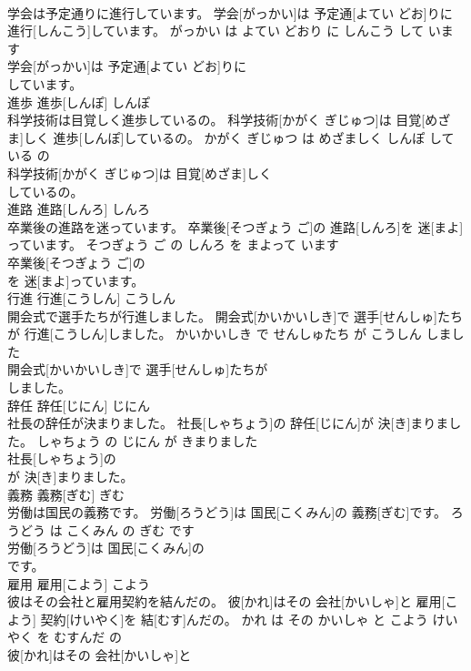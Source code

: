 \documentclass[8pt]{extreport}
\begin{document}
\begin{CJK}{UTF8}{min}
\\	学会は予定通りに進行しています。	学会[がっかい]は 予定通[よてい どお]りに 進行[しんこう]しています。	がっかい は よてい どおり に しんこう して います	
\\	学会[がっかい]は 予定通[よてい どお]りに
\\	しています。			
\\	進歩	進歩[しんぽ]	しんぽ	
\\	科学技術は目覚しく進歩しているの。	科学技術[かがく ぎじゅつ]は 目覚[めざま]しく 進歩[しんぽ]しているの。	かがく ぎじゅつ は めざましく しんぽ して いる の	
\\	科学技術[かがく ぎじゅつ]は 目覚[めざま]しく
\\	しているの。			
\\	進路	進路[しんろ]	しんろ	
\\	卒業後の進路を迷っています。	卒業後[そつぎょう ご]の 進路[しんろ]を 迷[まよ]っています。	そつぎょう ご の しんろ を まよって います	
\\	卒業後[そつぎょう ご]の
\\	を 迷[まよ]っています。			
\\	行進	行進[こうしん]	こうしん	
\\	開会式で選手たちが行進しました。	開会式[かいかいしき]で 選手[せんしゅ]たちが 行進[こうしん]しました。	かいかいしき で せんしゅたち が こうしん しました	
\\	開会式[かいかいしき]で 選手[せんしゅ]たちが
\\	しました。			
\\	辞任	辞任[じにん]	じにん	
\\	社長の辞任が決まりました。	社長[しゃちょう]の 辞任[じにん]が 決[き]まりました。	しゃちょう の じにん が きまりました	
\\	社長[しゃちょう]の
\\	が 決[き]まりました。			
\\	義務	義務[ぎむ]	ぎむ	
\\	労働は国民の義務です。	労働[ろうどう]は 国民[こくみん]の 義務[ぎむ]です。	ろうどう は こくみん の ぎむ です	
\\	労働[ろうどう]は 国民[こくみん]の
\\	です。			
\\	雇用	雇用[こよう]	こよう	
\\	彼はその会社と雇用契約を結んだの。	彼[かれ]はその 会社[かいしゃ]と 雇用[こよう] 契約[けいやく]を 結[むす]んだの。	かれ は その かいしゃ と こよう けいやく を むすんだ の	
\\	彼[かれ]はその 会社[かいしゃ]と

\end{CJK}
\end{document}
